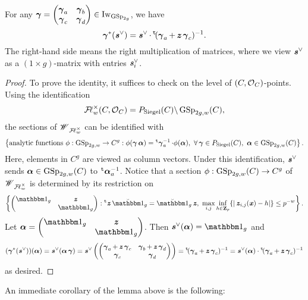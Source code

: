 \begin{Lemma}\label{Lemma: invariance of fake Hasse invariants}
For any $\bfgamma=\begin{pmatrix}\bfgamma_a &\bfgamma_b\\ \bfgamma_c & \bfgamma_d\end{pmatrix}\in \Iw_{\GSp_{2g}}$, we have
$$ \bfgamma^*(\bfits^{\vee}) = \bfits^{\vee} \cdot \trans(\bfgamma_a + \bfitz\bfgamma_c)^{-1}.$$ The right-hand side means the right multiplication of matrices, where we view $\bfits^{\vee}$ as a $(1\times g)$-matrix with entries $\bfits_i^{\vee}$.
\end{Lemma}
\begin{proof}
To prove the identity, it suffices to check on the level of $(C, \calO_C)$-points. Using the identification
$$\adicFL^\times_w(C, \calO_C)=P_{\Siegel}(C)\backslash\GSp_{2g, w}(C),$$
the sections of $\scrW_{\adicFL_w^{\times}}$ can be identified with
$$\left\{\text{analytic functions }\phi: \GSp_{2g,w}\rightarrow C^g: \phi(\bfgamma\bfalpha)=\trans\bfgamma_a^{-1}\cdot\phi(\bfalpha),\,\,\forall \bfgamma\in P_{\Siegel}(C),\,\, \bfalpha\in\GSp_{2g,w}(C)\right\}.$$
Here, elements in $C^g$ are viewed as column vectors. Under this identification, $\bfits^{\vee}$ sends $\bfalpha\in \GSp_{2g,w}(C)$ to $\trans\bfalpha_a^{-1}$. Notice that a section $\phi:\GSp_{2g,w}(C)\rightarrow C^g$ of $\scrW_{\adicFL_w^{\times}}$ is determined by its restriction on $$\left\{\begin{pmatrix}\one_g & \bfitz\\ & \one_g\end{pmatrix}: \trans\bfitz\oneanti_g=\oneanti_g\bfitz,\,\,\max_{i, j}\inf_{h\in \Z_p}\{|\bfitz_{i,j}(\bfitx)-h|\}\leq p^{-w} \right\}.$$ Let $\bfalpha=\begin{pmatrix}\one_g & \bfitz\\ & \one_g\end{pmatrix}$. Then $\bfits^{\vee}(\bfalpha)=\one_g$ and $$(\bfgamma^*(\bfits^{\vee}))(\bfalpha)=\bfits^{\vee}(\bfalpha\bfgamma)=\bfits^{\vee} \left(\begin{pmatrix}\bfgamma_a+ \bfitz\bfgamma_c & \bfgamma_b+\bfitz\bfgamma_d\\ \bfgamma_c & \bfgamma_d\end{pmatrix}\right)= \trans(\bfgamma_a+\bfitz\bfgamma_c)^{-1}=\bfits^{\vee}(\bfalpha) \cdot \trans(\bfgamma_a+\bfitz\bfgamma_c)^{-1}$$ as desired.
\end{proof}

An immediate corollary of the lemma above is the following:


